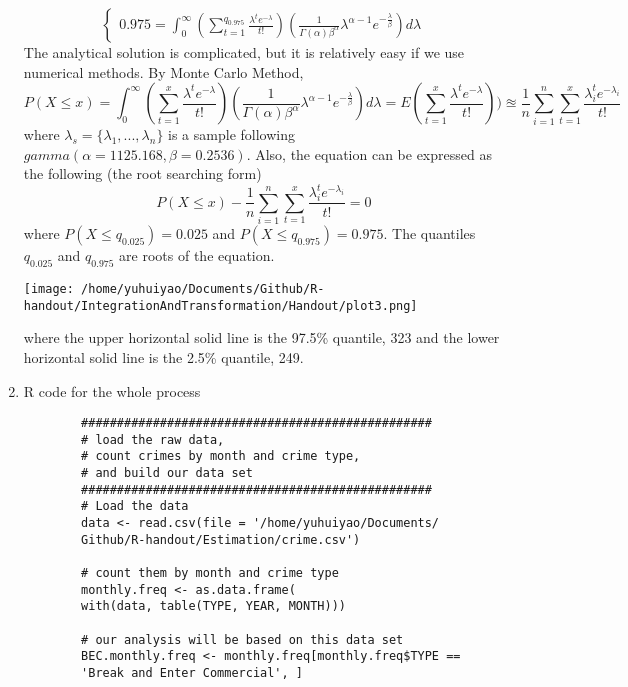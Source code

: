 \begin{enumerate}
\begin{equation*}
\begin{cases}
		0.975 = \int_{0}^{\infty}(\sum_{t = 1}^{q_{0.975}}\frac{\lambda^{t}e^{-\lambda}}{t!})(\frac{1}{\Gamma(\alpha)\beta^{\alpha}}\lambda^{\alpha - 1}e^{-\frac{\lambda}{\beta}}) d \lambda
		\end{cases}
	\end{equation*}
	The analytical solution is complicated, but it is relatively easy if we use numerical methods. By Monte Carlo Method,
	\begin{equation*}
		P(X \le x) = \int_{0}^{\infty}(\sum_{t = 1}^{x}\frac{\lambda^{t}e^{-\lambda}}{t!})(\frac{1}{\Gamma(\alpha)\beta^{\alpha}}\lambda^{\alpha - 1}e^{-\frac{\lambda}{\beta}}) d \lambda = E(\sum_{t = 1}^{x}\frac{\lambda^{t}e^{-\lambda}}{t!})) \approxeq \frac{1}{n} \sum_{i = 1}^{n} \sum_{t = 1}^{x}\frac{\lambda_i^{t}e^{-\lambda_i}}{t!}
	\end{equation*}
	where $\lambda_s = \{\lambda_1,...,\lambda_n \}$ is a sample following $gamma(\alpha= 1125.168, \beta = 0.2536)$. Also, the equation can be expressed as the following (the root searching form)
	\begin{equation*}
		P(X \le x) - \frac{1}{n} \sum_{i = 1}^{n} \sum_{t = 1}^{x}\frac{\lambda_i^{t}e^{-\lambda_i}}{t!} = 0
	\end{equation*}
	where $P(X \le q_{0.025}) = 0.025$ and $P(X \le  q_{0.975}) = 0.975$. The quantiles $q_{0.025}$ and $q_{0.975}$ are roots of the equation. 
	\begin{center}
		\texttt{[image: /home/yuhuiyao/Documents/Github/R-handout/IntegrationAndTransformation/Handout/plot3.png]}
	\end{center}
	where the upper horizontal solid line is the 97.5\% quantile, 323 and the lower horizontal solid line is the 2.5\% quantile, 249.
	\item R code for the whole process
	\begin{verbatim}
		#################################################
		# load the raw data, 
		# count crimes by month and crime type, 
		# and build our data set
		#################################################
		# Load the data
		data <- read.csv(file = '/home/yuhuiyao/Documents/
		Github/R-handout/Estimation/crime.csv') 
		
		# count them by month and crime type
		monthly.freq <- as.data.frame(
		with(data, table(TYPE, YEAR, MONTH)))
		
		# our analysis will be based on this data set
		BEC.monthly.freq <- monthly.freq[monthly.freq$TYPE == 
		'Break and Enter Commercial', ]
		

\end{verbatim}
\end{enumerate}
